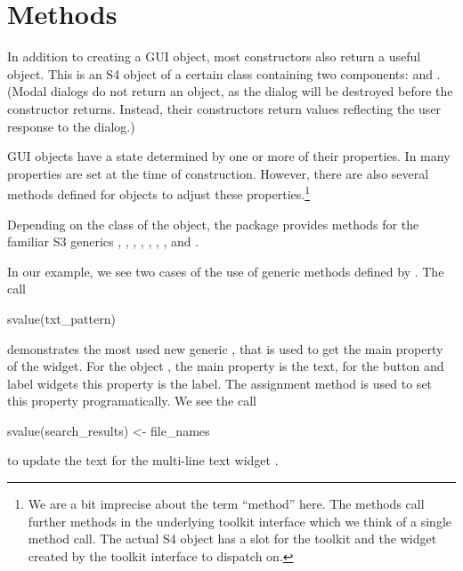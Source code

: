 
\section{Methods}


In addition to creating a GUI object, most 
constructors also return a useful \R\/ object. This is an S4 object of
a certain class containing two components:  and
. (Modal dialogs do not return an object, as the dialog
will be destroyed before the constructor returns. Instead, their
constructors return values reflecting the user response to the
dialog.)


GUI objects have a state determined by one or more of their
properties. In  many properties are set at the time of
construction. However, there are also several methods defined
for  objects to adjust these properties.\footnote{ We
  are a bit imprecise about the term ``method'' here. The
   methods call further methods in the underlying
  toolkit interface which we think of a single method call. The actual
  S4 object has a slot for the toolkit and the widget created by the
  toolkit interface to dispatch on.  }

Depending on the class of the object, the  package
provides methods for the familiar S3 generics \generic{[},
\generic{[$<$-}, , , ,
, ,  and
.


In our example, we see two cases of the use of generic methods defined
by . The call
\begin{Schunk}
\begin{Sinput}
 svalue(txt_pattern)
\end{Sinput}
\end{Schunk}
%
demonstrates the most used new generic  ,
that is used to get the main property of the widget. For the object
, the main property is the text, for the button and
label widgets this property is the label. The 
assignment method is used to set this property programatically. We see
the call
\begin{Schunk}
\begin{Sinput}
 svalue(search_results) <- file_names
\end{Sinput}
\end{Schunk}
to update the text for the multi-line text widget .

